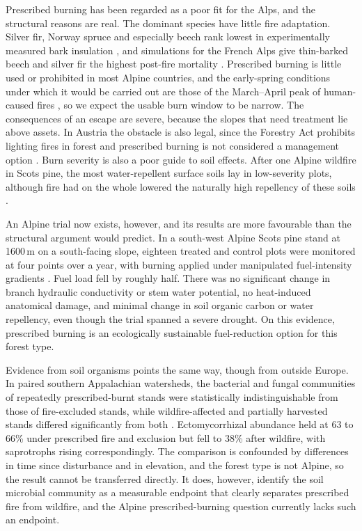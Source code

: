 \documentclass[11pt,a4paper]{article}
\begin{document}
Prescribed burning has been regarded as a poor fit for the Alps, and the structural reasons are real. The dominant species have little fire adaptation. Silver fir, Norway spruce and especially beech rank lowest in experimentally measured bark insulation \citep{mutterer_bark_2026}, and simulations for the French Alps give thin-barked beech and silver fir the highest post-fire mortality \citep{dupire_vulnerability_2019}. Prescribed burning is little used or prohibited in most Alpine countries, and the early-spring conditions under which it would be carried out are those of the March--April peak of human-caused fires \citep{muller_forest_2020}, so we expect the usable burn window to be narrow. The consequences of an escape are severe, because the slopes that need treatment lie above assets. In Austria the obstacle is also legal, since the Forestry Act prohibits lighting fires in forest and prescribed burning is not considered a management option \citep{neumann_fuel_2022}. Burn severity is also a poor guide to soil effects. After one Alpine wildfire in Scots pine, the most water-repellent surface soils lay in low-severity plots, although fire had on the whole lowered the naturally high repellency of these soils \citep{negri_wildfire_2026}.

An Alpine trial now exists, however, and its results are more favourable than the structural argument would predict. In a south-west Alpine Scots pine stand at 1600\,m on a south-facing slope, eighteen treated and control plots were monitored at four points over a year, with burning applied under manipulated fuel-intensity gradients \citep{gamba_prescribed_2025}. Fuel load fell by roughly half. There was no significant change in branch hydraulic conductivity or stem water potential, no heat-induced anatomical damage, and minimal change in soil organic carbon or water repellency, even though the trial spanned a severe drought. On this evidence, prescribed burning is an ecologically sustainable fuel-reduction option for this forest type.

Evidence from soil organisms points the same way, though from outside Europe. In paired southern Appalachian watersheds, the bacterial and fungal communities of repeatedly prescribed-burnt stands were statistically indistinguishable from those of fire-excluded stands, while wildfire-affected and partially harvested stands differed significantly from both \citep{snyder_taxonomic_2026}. Ectomycorrhizal abundance held at 63 to 66\% under prescribed fire and exclusion but fell to 38\% after wildfire, with saprotrophs rising correspondingly. The comparison is confounded by differences in time since disturbance and in elevation, and the forest type is not Alpine, so the result cannot be transferred directly. It does, however, identify the soil microbial community as a measurable endpoint that clearly separates prescribed fire from wildfire, and the Alpine prescribed-burning question currently lacks such an endpoint.
\end{document}
